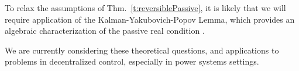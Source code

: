 \documentclass[11pt,twocolumn]{IEEEtran}
\def\notes#1{}
\def\Fig#1{Fig.~\ref{#1}}
\def\Thm#1{Thm.~\ref{#1}}
\begin{document}
To relax the assumptions of \Thm{t:reversiblePassive}, it is likely that we will require application of the Kalman-Yakubovich-Popov Lemma, which provides an algebraic characterization of the passive real condition \cite{ran96}.
 
We are currently considering these theoretical questions, and applications to problems in decentralized control, especially in power systems settings.

\notes{say somewhere:  The minimum phase condition observed in the numerical examples in \cite{meybarbusyueehr14} cannot be explained by any of the theory in this paper
since a Markov model with state transition diagram shown in \Fig{fig:pppDynamics} 
 cannot be reversible.}



 \newpage
 
 \def\cprime{}\def\cprime{}

\bigskip
\end{document}
